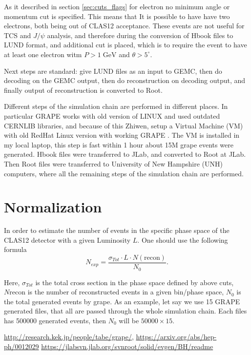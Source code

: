 \documentclass[letterpaper,12pt]{article}
\begin{document}
 As it described in section \ref{sec:cuts_flags} for electron no minimum angle or momentum cut is specified. This means that It is possible to have have two electrons,
 both being out of CLAS12 acceptance. These events are not useful for TCS and $J/\psi$ analysis, and therefore during the conversion of Hbook files to LUND format, and additional
 cut is placed, which is to require the event to have at least one electron witm $P> 1\; \mathrm{GeV}$ and $\theta > 5^{\circ}$.
 
 Next steps are standard: give LUND files as an input to GEMC, then do decoding on the GEMC output, then do reconstruction on decoding output, and finally
 output of reconstruction is converted to Root.
 
 Different steps of the simulation chain are performed in different places. In particular GRAPE works with old version of LINUX and used outdated CERNLIB libraries, and because of this 
 Zhiwen, setup a Virtual Machine (VM) with old RedHat Linux version with working GRAPE \cite{GRAPE_Zhiwen}. The VM is installed in my local laptop, this step is fast within 1 hour about
 15M grape events were generated. Hbook files were transferred to JLab, and converted to Root at JLab. Then Root files were transferred to University of New Hampshire (UNH) computers,
 where all the remaining steps of the simulation chain are performed.
 
 \section{Normalization}
 
 In order to estimate the number of events in the specific phase space of the CLAS12 detector with a given Luminosity $L$. One should use the following formula
 \begin{equation}
  N_{exp} = \frac{\displaystyle \sigma_{Tot}\cdot L\cdot N(\mathrm{recon})}{N_{0}}.
 \end{equation}

 Here, $\sigma_{Tot}$ is the total cross section in the phase space defined by above cuts, $N\mathrm{recon}$ is the number of reconstructed events in a given bin/phase space, $N_{0}$ is the total generated events by grape.
 As an example, let say we use 15 GRAPE generated files, that all are passed through the whole simulation chain. Each files has 500000 generated events,
 then $N_{0}$ will be $50000\times 15$.
 
 \begin{thebibliography}{50}
   \url{http://research.kek.jp/people/tabe/grape/}, \url{https://arxiv.org/abs/hep-ph/0012029}
   \url{https://jlabsvn.jlab.org/svnroot/solid/evgen/BH/readme}
 \end{thebibliography}

 
\end{document}
